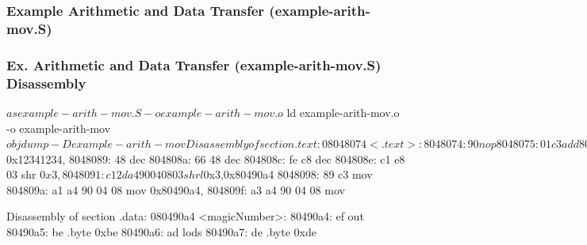 \documentclass[11pt,xcolor=dvipsnames]{beamer}
\newcommand{\mvs}{\vspace{-0.95em}}
\begin{document}
\begin{frame}[fragile,t]
\frametitle{Example Arithmetic and Data Transfer (example-arith-mov.S)}
\mvs
{}
\end{frame}

\begin{frame}[fragile,t]
\frametitle{Ex. Arithmetic and Data Transfer (example-arith-mov.S) Disassembly}
\mvs
\begin{customobjdumpcode}
$ as example-arith-mov.S -o example-arith-mov.o
$ ld example-arith-mov.o -o example-arith-mov
$ objdump -D example-arith-mov

Disassembly of section .text:
08048074 <.text>:
 8048074: 90                    nop
 8048075: 01 c3                 add    %
 8048077: 03 1d a4 90 04 08     add    0x80490a4,%
 804807d: 01 1d a4 90 04 08     add    %
 8048083: 81 c3 34 12 34 12     add    $0x12341234,%
 8048089: 48                    dec    %
 804808a: 66 48                 dec    %
 804808c: fe c8                 dec    %
 804808e: c1 e8 03              shr    $0x3,%
 8048091: c1 2d a4 90 04 08 03  shrl   $0x3,0x80490a4
 8048098: 89 c3                 mov    %
 804809a: a1 a4 90 04 08        mov    0x80490a4,%
 804809f: a3 a4 90 04 08        mov    %

Disassembly of section .data:
080490a4 <magicNumber>:
 80490a4: ef                    out    %
 80490a5: be                    .byte 0xbe
 80490a6: ad                    lods   %
 80490a7: de                    .byte 0xde

\end{customobjdumpcode}
\end{frame}
\end{document}
